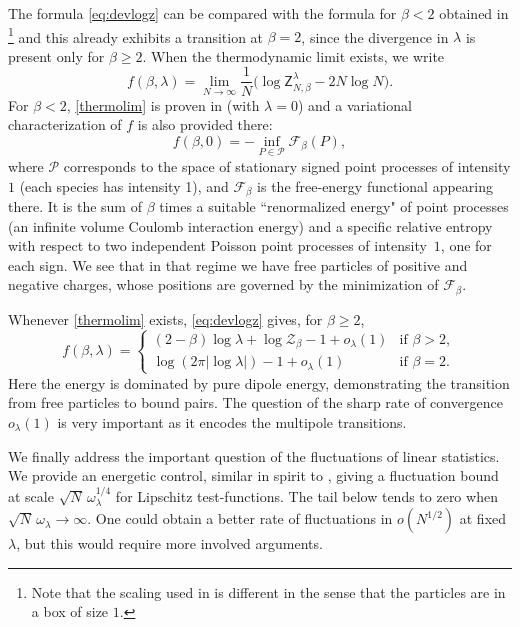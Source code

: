 \documentclass[a4paper,10pt,leqno]{amsart}
\numberwithin{equation}{section}
\def\Z{\mathsf{Z}_{N,\beta}^{\lambda}}
\begin{document}
The formula \eqref{eq:devlogz} can be compared with the formula for $\beta<2$ obtained in \cite{LSZ}\footnote{Note that the scaling used in \cite{LSZ} is different in the sense that the particles are in a box of size $1$.} and this already exhibits a transition at $\beta=2$, since the divergence in $\lambda$ is present only for $\beta \ge 2$.
When the thermodynamic limit exists, we write
\begin{equation}\label{thermolim}
  f(\beta,\lambda)=\lim_{N\to\infty}\frac1N\bigl(\log\Z-2N\log N\bigr).
\end{equation}
For $\beta<2$, \eqref{thermolim} is proven in \cite{LSZ} (with $\lambda=0$) and a variational characterization of $f$ is also provided there:
\begin{equation*} f(\beta, 0)= -\inf_{P\in\mathcal P} \mathcal F_\beta(P),\end{equation*}
where $\mathcal P $ corresponds to the space of stationary signed point processes of intensity $1$ (each species has intensity 1), and
$\mathcal F_\beta$ is the free-energy functional appearing there. It is the sum of $\beta$ times a suitable ``renormalized energy" of point processes (an infinite volume Coulomb interaction energy) and a specific relative entropy with respect to two independent Poisson point processes of intensity~$1$, one for each sign. We see that in that regime we have free particles of positive and negative charges, whose positions are governed by the minimization of $\mathcal F_\beta$.

Whenever \eqref{thermolim} exists, \eqref{eq:devlogz} gives, for $\beta\ge2$,
\begin{equation*}
  f(\beta,\lambda)=
  \begin{cases}
    (2-\beta)\log\lambda+\log\mathcal Z_\beta-1+o_\lambda(1) & \text{if $\beta>2$},\\
    \log(2\pi|\log\lambda|)-1+o_\lambda(1) & \text{if $\beta=2$}.
  \end{cases}
\end{equation*}
Here the energy is dominated by pure dipole energy, demonstrating the transition from free particles to bound pairs.
The question of the sharp rate of convergence $o_\lambda(1)$ is very important as it encodes the multipole transitions.

We finally address the important question of the fluctuations of linear statistics. We provide an energetic control, similar in spirit to \cite[Prop. 2.5]{LS2}, giving a fluctuation bound at scale $\sqrt N\,\omega_\lambda^{1/4}$ for Lipschitz test-functions. The tail below tends to zero when $\sqrt N\,\omega_\lambda\to\infty$. One could obtain a better rate of fluctuations in $o(N^{1/2})$ at fixed $\lambda$, but this would require more involved arguments.
\end{document}
